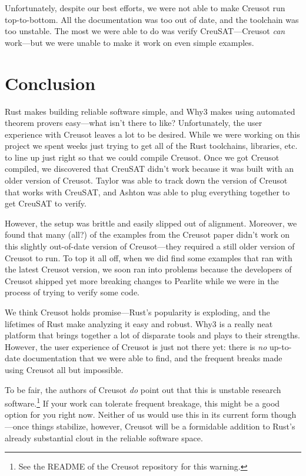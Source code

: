\documentclass[12pt]{article}
\begin{document}
Unfortunately, despite our best efforts, we were not able to make Creusot run top-to-bottom.
All the documentation was too out of date, and the toolchain was too unstable.
The most we were able to do was verify CreuSAT---Creusot \emph{can} work---but we were unable to make it work on even simple examples.

\section{Conclusion}

Rust makes building reliable software simple, and Why3 makes using automated theorem provers easy---what isn't there to like?
Unfortunately, the user experience with Creusot leaves a lot to be desired.
While we were working on this project we spent weeks just trying to get all of the Rust toolchains, libraries, etc. to line up just right so that we could compile Creusot.
Once we got Creusot compiled, we discovered that CreuSAT didn't work because it was built with an older version of Creusot.
Taylor was able to track down the version of Creusot that works with CreuSAT, and Ashton was able to plug everything together to get CreuSAT to verify.

However, the setup was brittle and easily slipped out of alignment.
Moreover, we found that many (all?) of the examples from the Creusot paper didn't work on this slightly out-of-date version of Creusot---they required a still older version of Creusot to run.
To top it all off, when we did find some examples that ran with the latest Creusot version, we soon ran into problems because the developers of Creusot shipped yet more breaking changes to Pearlite while we were in the process of trying to verify some code.

We think Creusot holds promise---Rust's popularity is exploding, and the lifetimes of Rust make analyzing it easy and robust.
Why3 is a really neat platform that brings together a lot of disparate tools and plays to their strengths.
However, the user experience of Creusot is just not there yet: there is \emph{no} up-to-date documentation that we were able to find, and the frequent breaks made using Creusot all but impossible.

To be fair, the authors of Creusot \emph{do} point out that this is unstable research software.\footnote{See the README of the Creusot\cite{denisCreusot2023} repository for this warning.}
If your work can tolerate frequent breakage, this might be a good option for you right now.
Neither of us would use this in its current form though---once things stabilize, however, Creusot will be a formidable addition to Rust's already substantial clout in the reliable software space.
\end{document}
